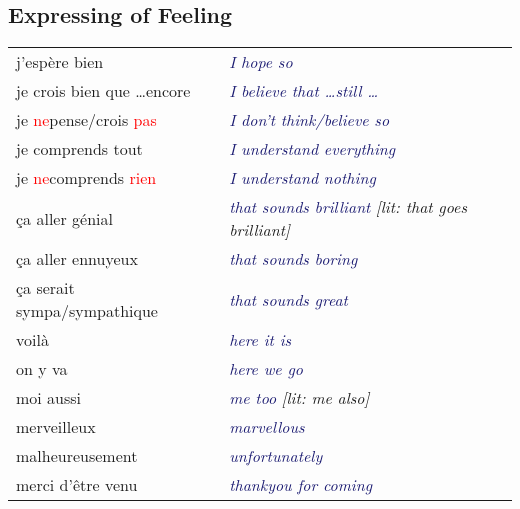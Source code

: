 \documentclass{microdoc} %
\newcommand\lEng[1]{\textcolor{MidnightBlue}{{\it #1}}}
\newcommand\lEngLit[1]{{\it[lit: \textcolor{NavyBlue}{#1}]}}
\newcommand\lASpace[1]{\IfSubStr{#1}{'}{}{\xspace}}
\newcommand\lNeg[3]{{\textcolor{Red}{#1}\lASpace{#1}#2 \textcolor{Red}{#3}}}
\begin{document}
\subsection{Expressing of Feeling}
\begin{table}[H]
    \begin{tabular}{l l}
        j'espère bien                          & \lEng{I hope so}\\
        je crois bien que \ldots encore        & \lEng{I believe that \ldots still \ldots}\\
        je \lNeg{ne}{pense/crois}{pas}         & \lEng{I don't think/believe so}\\
        je comprends tout                      & \lEng{I understand everything}\\
        je \lNeg{ne}{comprends}{rien}          & \lEng{I understand nothing}\\
        ça aller génial                        & \lEng{that sounds brilliant} \lEngLit{that goes brilliant}\\
        ça aller ennuyeux                      & \lEng{that sounds boring}\\
        ça serait sympa/sympathique            & \lEng{that sounds great}\\
        voilà                                  & \lEng{here it is}\\
        on y va                                & \lEng{here we go}\\
        moi aussi                              & \lEng{me too} \lEngLit{me also}\\
        merveilleux                            & \lEng{marvellous}\\
        malheureusement                        & \lEng{unfortunately}\\
        merci d'être venu                      & \lEng{thankyou for coming}\\
    \end{tabular}
\end{table}
\end{document}
